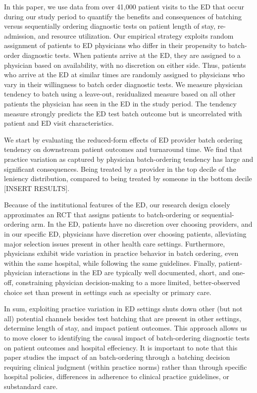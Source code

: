 \documentclass[,,nonblindrev]{informs}
\begin{document}
In this paper, we use data from over 41,000 patient visits to the ED
that occur during our study period to quantify the benefits and
consequences of batching versus sequentially ordering diagnostic tests
on patient length of stay, re-admission, and resource utilization. Our
empirical strategy exploits random assignment of patients to ED
physicians who differ in their propensity to batch-order diagnostic
tests. When patients arrive at the ED, they are assigned to a physician
based on availability, with no discretion on either side. Thus, patients
who arrive at the ED at similar times are randomly assigned to
physicians who vary in their willingness to batch order diagnostic
tests. We measure physician tendency to batch using a leave-out,
residualized measure based on all other patients the physician has seen
in the ED in the study period. The tendency measure strongly predicts
the ED test batch outcome but is uncorrelated with patient and ED visit
characteristics.

We start by evaluating the reduced-form effects of ED provider batch
ordering tendency on downstream patient outcomes and turnaround time. We
find that practice variation as captured by physician batch-ordering
tendency has large and significant consequences. Being treated by a
provider in the top decile of the leniency distribution, compared to
being treated by someone in the bottom decile {[}INSERT RESULTS{]}.

Because of the institutional features of the ED, our research design
closely approximates an RCT that assigns patients to batch-ordering or
sequential-ordering arm. In the ED, patients have no discretion over
choosing providers, and in our specific ED, physicians have discretion
over choosing patients, alleviating major selection issues present in
other health care settings. Furthermore, physicians exhibit wide
variation in practice behavior in batch ordering, even within the same
hospital, while following the same guidelines. Finally,
patient-physician interactions in the ED are typically well documented,
short, and one-off, constraining physician decision-making to a more
limited, better-observed choice set than present in settings such as
specialty or primary care.

In sum, exploiting practice variation in ED settings shuts down other
(but not all) potential channels besides test batching that are present
in other settings, determine length of stay, and impact patient
outcomes. This approach allows us to move closer to identifying the
causal impact of batch-ordering diagnostic tests on patient outcomes and
hospital effeciency. It is important to note that this paper studies the
impact of an batch-ordering through a batching decision requiring
clinical judgment (within practice norms) rather than through specific
hospital policies, differences in adherence to clinical practice
guidelines, or substandard care.
\end{document}
